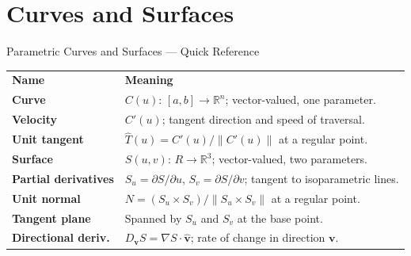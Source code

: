 
\section{Curves and Surfaces}

\begin{toolkitbox}{Parametric Curves and Surfaces --- Quick Reference}
\begin{tabular}{@{}p{}p{}@{}}
\textbf{Name} & \textbf{Meaning} \\
\textbf{Curve}               & $C(u):\,[a,b]\to\mathbb{R}^n$; vector-valued, one parameter. \\[4pt]
\textbf{Velocity}            & $C'(u)$; tangent direction and speed of traversal. \\[4pt]
\textbf{Unit tangent}        & $\hat{T}(u) = C'(u)/\|C'(u)\|$ at a regular point. \\[4pt]
\textbf{Surface}             & $S(u,v):\,R\to\mathbb{R}^3$; vector-valued, two parameters. \\[4pt]
\textbf{Partial derivatives} & $S_u = \partial S/\partial u$,\; $S_v = \partial S/\partial v$; tangent to isoparametric lines. \\[4pt]
\textbf{Unit normal}         & $N = (S_u\times S_v)/\|S_u\times S_v\|$ at a regular point. \\[4pt]
\textbf{Tangent plane}       & Spanned by $S_u$ and $S_v$ at the base point. \\[4pt]
\textbf{Directional deriv.}  & $D_{\mathbf{v}}S = \nabla S \cdot \hat{\mathbf{v}}$; rate of change in direction $\mathbf{v}$. \\
\end{tabular}
\end{toolkitbox}



